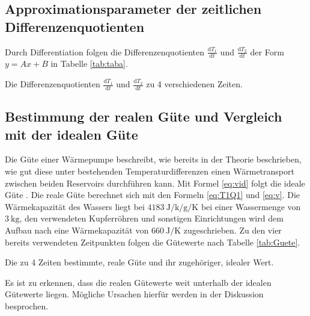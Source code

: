 \subsection{Approximationsparameter der zeitlichen Differenzenquotienten}

Durch Differentiation folgen die Differenzenquotienten
$\frac{\text{d}T_1}{\text{d}t}$ und $\frac{\text{d}T_2}{\text{d}t}$ der Form $y = Ax+B$ in Tabelle \ref{tab:taba}.

\begin{table}
  \centering
  \caption{Die Differenzenquotienten $\frac{\text{d}T_1}{\text{d}t}$ und $\frac{\text{d}T_2}{\text{d}t}$ zu 4 verschiedenen Zeiten.}
  \label{tab:Ableitungen}
\end{table}

\subsection{Bestimmung der realen Güte und Vergleich mit der idealen Güte}
Die Güte einer Wärmepumpe beschreibt, wie bereits in der Theorie beschrieben,
wie gut diese unter bestehenden Temperaturdifferenzen einen Wärmetransport zwischen
beiden Reservoirs durchführen kann. Mit Formel \ref{eq:vid} folgt die ideale Güte . Die
reale Güte berechnet sich mit den Formeln \ref{eq:T1Q1} und \ref{eq:v}. Die Wärmekapazität des Wassers
liegt bei $\SI{4183}{\joule\per\kilo\per\gram\per\kelvin}$ \cite{cw} bei einer Wassermenge von $\SI{3}{\kilo\gram}$, den verwendeten
Kupferröhren und sonstigen Einrichtungen wird dem Aufbau \cite{V206} nach eine Wärmekapazität von $\SI{660}{\joule\per\kelvin}$ zugeschrieben.
Zu den vier bereits verwendeten Zeitpunkten folgen die Gütewerte nach Tabelle \ref{tab:Guete}.

\begin{table}
  \centering
  \caption{Die zu 4 Zeiten bestimmte, reale Güte und ihr zugehöriger, idealer Wert.}
  \label{tab:Guete}
\end{table}

Es ist zu erkennen, dass die realen Gütewerte weit unterhalb der idealen Gütewerte liegen.
Mögliche Ursachen hierfür werden in der Diskussion besprochen.

